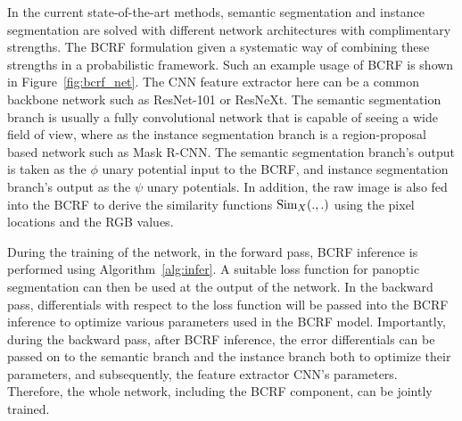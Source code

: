 In the current state-of-the-art methods, semantic segmentation and instance segmentation are solved with different network architectures with complimentary strengths. The BCRF formulation given a systematic way of combining these strengths in a probabilistic framework. Such an example usage of BCRF is shown in Figure~\ref{fig:bcrf_net}. The CNN feature extractor here can be a common backbone network such as ResNet-101 or ResNeXt. The semantic segmentation branch is usually a fully convolutional network that is capable of seeing a wide field of view, where as the instance segmentation branch is a region-proposal based network such as Mask R-CNN. The semantic segmentation branch's output is taken as the $\phi$ unary potential input to the BCRF, and instance segmentation branch's output as the $\psi$ unary potentials. In addition, the raw image is also fed into the BCRF to derive the similarity functions $\operatorname{Sim}_X(., .)$ using the pixel locations and the RGB values. 

During the training of the network, in the forward pass, BCRF inference is performed using Algorithm~\ref{alg:infer}. A suitable loss function for panoptic segmentation can then be used at the output of the network. In the backward pass, differentials with respect to the loss function will be passed into the BCRF inference to optimize various parameters used in the BCRF model. Importantly, during the backward pass, after BCRF inference, the error differentials can be passed on to the semantic branch and the instance branch both to optimize their parameters, and subsequently, the feature extractor CNN's parameters. Therefore, the whole network, including the BCRF component, can be jointly trained.


